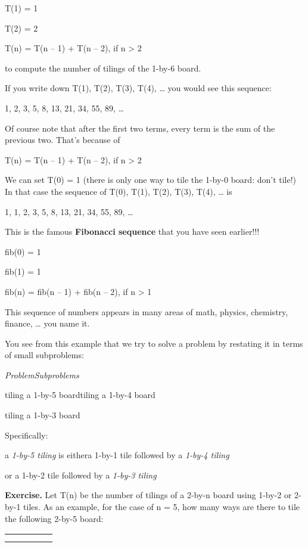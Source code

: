 \documentclass[
]{article}
\begin{document}
T(1) = 1

T(2) = 2

T(n) = T(n -- 1) + T(n -- 2), if n \textgreater{} 2

to compute the number of tilings of the 1-by-6 board.

If you write down T(1), T(2), T(3), T(4), \ldots{} you would see this
sequence:

1, 2, 3, 5, 8, 13, 21, 34, 55, 89, \ldots{}

Of course note that after the first two terms, every term is the sum of
the previous two. That's because of

T(n) = T(n -- 1) + T(n -- 2), if n \textgreater{} 2

We can set T(0) = 1 (there is only one way to tile the 1-by-0 board:
don't tile!) In that case the sequence of T(0), T(1), T(2), T(3), T(4),
\ldots{} is

1, 1, 2, 3, 5, 8, 13, 21, 34, 55, 89, \ldots{}

This is the famous \textbf{Fibonacci sequence} that you have seen
earlier!!!

fib(0) = 1

fib(1) = 1

fib(n) = fib(n -- 1) + fib(n -- 2), if n \textgreater{} 1

This sequence of numbers appears in many areas of math, physics,
chemistry, finance, \ldots{} you name it.

You see from this example that we try to solve a problem by restating it
in terms of small subproblems:

\emph{ProblemSubproblems}

tiling a 1-by-5 boardtiling a 1-by-4 board

tiling a 1-by-3 board

Specifically:

a \emph{1-by-5 tiling} is eithera 1-by-1 tile followed by a \emph{1-by-4
tiling}

or a 1-by-2 tile followed by a \emph{1-by-3 tiling}

\textbf{Exercise.} Let T(n) be the number of tilings of a 2-by-n board
using 1-by-2 or 2-by-1 tiles. As an example, for the case of n = 5, how
many ways are there to tile the following 2-by-5 board:

\begin{longtable}[]{@{}lllll@{}}
\toprule
\endhead
& & & &\tabularnewline
& & & &\tabularnewline
\bottomrule
\end{longtable}
\end{document}
